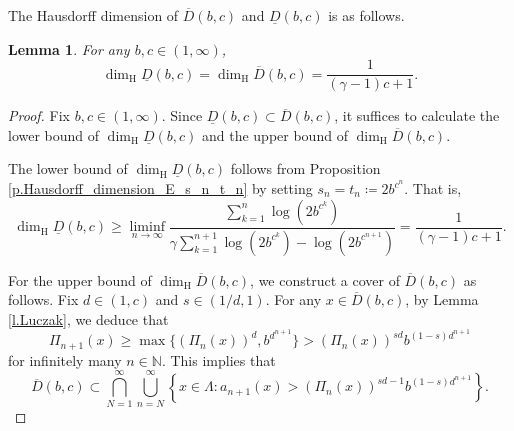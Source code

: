 \documentclass[12pt,reqno]{amsart}
\renewcommand{\=}{\coloneqq}
\theoremstyle{plain}
\newtheorem{lemma}[theorem]{Lemma}
\begin{document}
The Hausdorff dimension of $\overline{D}(b,c)$ and $\underline{D}(b,c)$ is as follows.


\begin{lemma}\label{l.Hausdorff_dimension_pi_n_x>=a^c^n}
For any $b,c \in (1,\infty)$,
        \begin{equation*}
                \dim_{\mathrm{H}}
                \underline{D}(b,c)
                =\dim_{\mathrm{H}}
                \overline{D}(b,c)
                =\frac{1}{(\gamma-1)c+1}.
         \end{equation*}
\end{lemma}

\begin{proof}
Fix $b,c \in (1,\infty)$.
Since $\underline{D}(b,c) \subset \overline{D}(b,c)$, it suffices to calculate the lower bound of $\dim_{\mathrm{H}}\underline{D}(b,c)$ and the upper bound of $\dim_{\mathrm{H}}\overline{D}(b,c)$.

The lower bound of $\dim_{\mathrm{H}}\underline{D}(b,c)$ follows from Proposition \ref{p.Hausdorff_dimension_E_s_n_t_n} by setting $s_n=t_n \coloneqq 2b^{c^n}$. That is,
        \begin{equation*}
                \dim_{\mathrm{H}}
                \underline{D}(b,c)
                \geq \liminf _{n\to \infty}
                \frac{\sum_{k=1}^n\log (2b^{c^k})}
                {\gamma\sum_{k=1}^{n+1}\log (2b^{c^k})-\log (2b^{c^{n+1}})}
                =\frac{1}{(\gamma-1)c+1}.
        \end{equation*}


For the upper bound of $\dim_{\mathrm{H}}\overline{D}(b,c)$, we construct a cover of $\overline{D}(b,c)$ as follows. Fix $d\in (1,c)$ and $s\in (1/d,1)$. For any $x\in \overline{D}(b,c)$, by Lemma \ref{l.Luczak}, we deduce that
        \begin{equation*}
                \Pi_{n+1}(x)\geq
                \max \{
                        (\Pi_{n}(x))^d,
                        b^{d^{n+1}}
                \}
                >
                (\Pi_{n}(x))^{sd}b^{(1-s)d^{n+1}}
        \end{equation*}
for infinitely many $n\in \mathbb N$. This implies that
        \begin{equation}\label{limsupLambda}
                \overline{D}(b,c)\subset
                \bigcap_{N=1}^{\infty}
                \bigcup_{n=N}^{\infty}
               \left\{
                        x\in \Lambda:
                        a_{n+1}(x)>
                (\Pi_{n}(x))^{sd-1}b^{(1-s)d^{n+1}}
                \right\}.
        \end{equation}


\end{proof}
\end{document}
